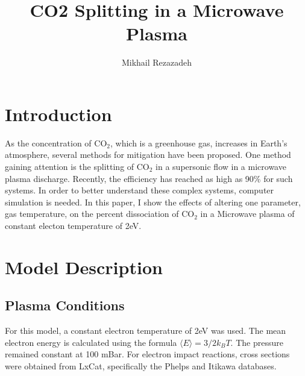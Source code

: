 \documentclass[twocolumn,10pt,a4paper]{article}
\title{
        CO2 Splitting in a Microwave Plasma
}
\author{Mikhail Rezazadeh}%
\date{}
\begin{document}


%
%
%
%
\section{Introduction}
As the concentration of CO$_2$, which is a greenhouse gas, increases in Earth's atmosphere,
several methods for mitigation have been proposed. One method gaining attention is the
splitting of CO$_2$ in a supersonic flow in a microwave plasma discharge. Recently, the efficiency
has reached as high as 90\% for such systems. In order to better understand these complex systems,
computer simulation is needed. In this paper, I show the effects of altering one parameter, gas
temperature, on the percent dissociation of CO$_2$ in a Microwave plasma of constant electon
temperature of 2eV.


\section{Model Description}

\subsection{Plasma Conditions}
For this model, a constant electron temperature of 2eV was used.  The mean
electron energy is calculated using the formula $\langle E \rangle = 3/2 k_BT$. The pressure
remained constant at 100 mBar. For electron
impact reactions, cross sections were obtained from LxCat, specifically the Phelps
and Itikawa databases.
\end{document}
